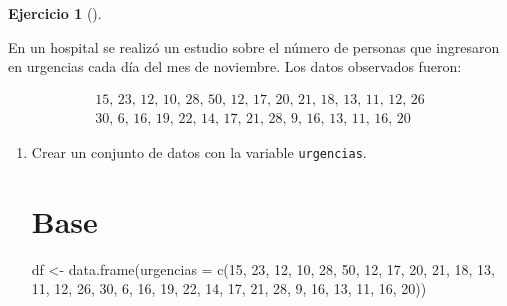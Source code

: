 \documentclass[
  spanish,
  a4paper,
]{scrreport}
\newenvironment{Shaded}{\begin{snugshade}}{\end{snugshade}}
\newcommand{\AttributeTok}[1]{\textcolor[rgb]{0.40,0.45,0.13}{#1}}
\newcommand{\DecValTok}[1]{\textcolor[rgb]{0.68,0.00,0.00}{#1}}
\newcommand{\FunctionTok}[1]{\textcolor[rgb]{0.28,0.35,0.67}{#1}}
\newcommand{\NormalTok}[1]{\textcolor[rgb]{0.00,0.23,0.31}{#1}}
\newcommand{\OtherTok}[1]{\textcolor[rgb]{0.00,0.23,0.31}{#1}}
\theoremstyle{definition}
\newtheorem{exercise}{Ejercicio}[chapter]
\theoremstyle{remark}
\begin{document}
\begin{exercise}[]\protect\hypertarget{exr-frecuencias-graficos-urgencias}{}\label{exr-frecuencias-graficos-urgencias}

En un hospital se realizó un estudio sobre el número de personas que
ingresaron en urgencias cada día del mes de noviembre. Los datos
observados fueron:

\[
\begin{array}{c}
\mbox{15, 23, 12, 10, 28, 50, 12, 17, 20, 21, 18, 13, 11, 12, 26} \\
\mbox{30, 6, 16, 19, 22, 14, 17, 21, 28, 9, 16, 13, 11, 16, 20}
\end{array}
\]

\begin{enumerate}
\def\labelenumi{\alph{enumi}.}
\item
  Crear un conjunto de datos con la variable \texttt{urgencias}.

  \begin{tcolorbox}[enhanced jigsaw, colback=white, coltitle=black, toprule=.15mm, rightrule=.15mm, opacitybacktitle=0.6, opacityback=0, bottomtitle=1mm, toptitle=1mm, titlerule=0mm, breakable, leftrule=.75mm, title=\textcolor{quarto-callout-tip-color}{\faLightbulb}\hspace{0.5em}{Solución}, arc=.35mm, left=2mm, bottomrule=.15mm, colframe=quarto-callout-tip-color-frame, colbacktitle=quarto-callout-tip-color!10!white]

  \section{Base}

\begin{Shaded}
\begin{Highlighting}[]
\NormalTok{df }\OtherTok{\textless{}{-}} \FunctionTok{data.frame}\NormalTok{(}\AttributeTok{urgencias =} \FunctionTok{c}\NormalTok{(}\DecValTok{15}\NormalTok{, }\DecValTok{23}\NormalTok{, }\DecValTok{12}\NormalTok{, }\DecValTok{10}\NormalTok{, }\DecValTok{28}\NormalTok{, }\DecValTok{50}\NormalTok{, }\DecValTok{12}\NormalTok{, }\DecValTok{17}\NormalTok{, }\DecValTok{20}\NormalTok{, }\DecValTok{21}\NormalTok{, }\DecValTok{18}\NormalTok{, }\DecValTok{13}\NormalTok{, }\DecValTok{11}\NormalTok{, }\DecValTok{12}\NormalTok{, }\DecValTok{26}\NormalTok{, }\DecValTok{30}\NormalTok{, }\DecValTok{6}\NormalTok{, }\DecValTok{16}\NormalTok{, }\DecValTok{19}\NormalTok{, }\DecValTok{22}\NormalTok{, }\DecValTok{14}\NormalTok{, }\DecValTok{17}\NormalTok{, }\DecValTok{21}\NormalTok{, }\DecValTok{28}\NormalTok{, }\DecValTok{9}\NormalTok{, }\DecValTok{16}\NormalTok{, }\DecValTok{13}\NormalTok{, }\DecValTok{11}\NormalTok{, }\DecValTok{16}\NormalTok{, }\DecValTok{20}\NormalTok{))}
\end{Highlighting}
\end{Shaded}


\end{tcolorbox}
\end{enumerate}
\end{exercise}
\end{document}
